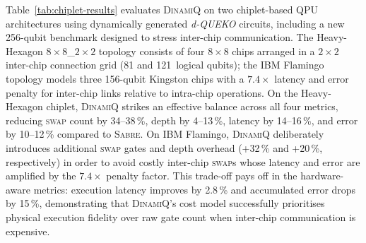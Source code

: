 
Table~\ref{tab:chiplet-results} evaluates \textsc{DinamiQ} on two
chiplet-based QPU architectures using dynamically generated \textit{d-QUEKO}
circuits, including a new 256-qubit benchmark designed to stress inter-chip
communication.
The Heavy-Hexagon $8{\times}8$\_$2{\times}2$ topology consists of four
$8{\times}8$ chips arranged in a $2{\times}2$ inter-chip connection grid
(81 and 121~logical qubits); the IBM Flamingo topology models three
156-qubit Kingston chips with a $7.4{\times}$ latency and error penalty for
inter-chip links relative to intra-chip operations.
On the Heavy-Hexagon chiplet, \textsc{DinamiQ} strikes an effective balance
across all four metrics, reducing \textsc{swap} count by 34--38\,\%, depth
by 4--13\,\%, latency by 14--16\,\%, and error by 10--12\,\% compared to
\textsc{Sabre}.
On IBM Flamingo, \textsc{DinamiQ} deliberately introduces additional
\textsc{swap} gates and depth overhead (+32\,\% and +20\,\%, respectively)
in order to avoid costly inter-chip \textsc{swap}s whose latency and error
are amplified by the $7.4{\times}$ penalty factor.
This trade-off pays off in the hardware-aware metrics: execution latency
improves by 2.8\,\% and accumulated error drops by 15\,\%, demonstrating that
\textsc{DinamiQ}'s cost model successfully prioritises physical execution
fidelity over raw gate count when inter-chip communication is expensive.

